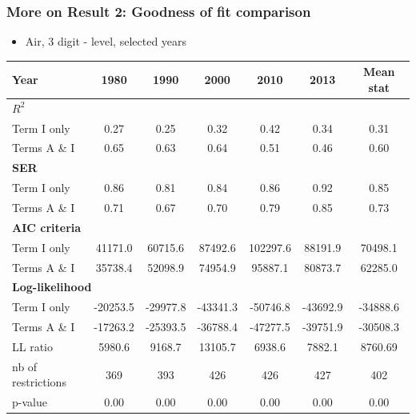 \documentclass[10 pt,Helvetica, french]{beamer}
\begin{document}
\begin{frame}[label=app_goodnessfit]
\frametitle{More on Result 2: Goodness of fit comparison}
\begin{itemize}
\item Air, 3 digit - level, selected years
\end{itemize}
\begin{table}[htbp]
  \centering
  \scriptsize{
\begin{center}
    \begin{tabular}{l|ccccc|c}
    \hline \hline
    Year  &1980  & 1990  & 2000  & 2010 & 2013 & Mean stat \\ \hline
    \multicolumn{7}{l}{\bf{$R^2$} }\\ \hline
    Term I only &  0.27  & 0.25  & 0.32  & 0.42 & 0.34 & 0.31 \\
    Terms A \& I &  0.65  & 0.63  & 0.64  & 0.51 & 0.46 & 0.60 \\ \hline
    \multicolumn{7}{l}{\textbf{SER}  }  \\ \hline
    Term I only &  0.86  & 0.81  & 0.84  & 0.86 & 0.92 & 0.85 \\
    Terms A \& I &  0.71  & 0.67  & 0.70  & 0.79 & 0.85 & 0.73 \\ \hline
   \multicolumn{7}{l}{\textbf{AIC criteria}}  \\ \hline
    Term I only &  41171.0 & 60715.6 & 87492.6 & 102297.6 & 88191.9 & 70498.1 \\
    Terms A \& I & 35738.4 & 52098.9 & 74954.9 & 95887.1 & 80873.7 & 62285.0 \\ \hline
    \multicolumn{7}{l}{\textbf{Log-likelihood}} \\ \hline
    Term I only &  -20253.5 & -29977.8 & -43341.3 & -50746.8 & -43692.9 & -34888.6 \\
    Terms A \& I &  -17263.2 & -25393.5 & -36788.4 & -47277.5 & -39751.9 & -30508.3 \\
    LL ratio &  5980.6 & 9168.7 & 13105.7 & 6938.6 & 7882.1 & 8760.69 \\
    nb of restrictions & 369   & 393   & 426   & 426 & 427 & 402 \\
    p-value & 0.00 & 0.00 & 0.00 & 0.00 & 0.00 & 0.00 \\
    \hline \hline
 \end{tabular}%
    \end{center}}
\end{table}%
\hyperlink{slide_goodnessfit}{}
\end{frame}
\end{document}
